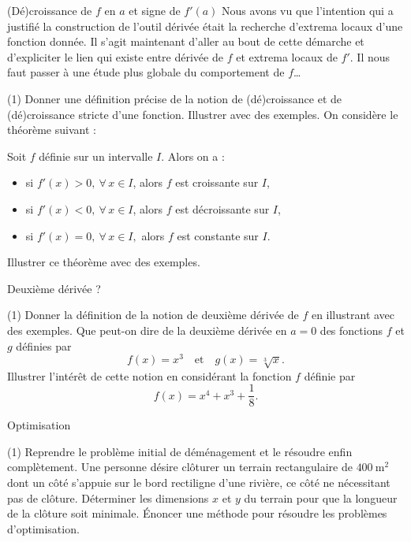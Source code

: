 \documentclass[a4paper,12pt]{article}
\begin{document}
\begin{activite}{(Dé)croissance de \(f\) en \(a\) et signe de \(f'(a)\)}
\tcblower
Nous avons vu que l’intention qui a justifié la construction de l’outil dérivée était la recherche d’extrema locaux d’une fonction donnée. Il s’agit maintenant d’aller au bout de cette démarche et d’expliciter le lien qui existe entre dérivée de \(f\) et extrema locaux de \(f'\). Il nous faut passer à une étude plus globale du comportement de \(f\)\ldots

\begin{tasks}(1)
  \task Donner une définition précise de la notion de (dé)croissance et de (dé)croissance stricte d’une fonction. Illustrer avec des exemples.
  \task On considère le théorème suivant :

  Soit \(f\) définie sur un intervalle \(I\). Alors on a :
  \begin{itemize}
	  \item si $f'(x)>0,\ \forall\,x\in I$, alors $f$ est croissante sur $I$,
\item si $f'(x)<0,\ \forall\,x\in I$, alors $f$ est décroissante sur $I$,
\item si $f'(x)=0,\ \forall\,x\in I,$ alors $f$ est constante sur $I$.
\end{itemize}
  Illustrer ce théorème avec des exemples.
\end{tasks}
\end{activite}

\begin{activite}{Deuxième dérivée ?}
\tcblower
\begin{tasks}(1)
  \task Donner la définition de la notion de deuxième dérivée de \(f\) en illustrant avec des exemples.
  \task Que peut-on dire de la deuxième dérivée en \(a=0\) des fonctions \(f\) et \(g\) définies par
  \[
    f(x)=x^3
    \quad\text{et}\quad
    g(x)=\sqrt[3]{x}.
  \]
  \task Illustrer l’intérêt de cette notion en considérant la fonction \(f\) définie par
  \[
    f(x)=x^4+x^3+\dfrac{1}{8}.
  \]
\end{tasks}
\end{activite}

\begin{activite}{Optimisation}
\tcblower
\begin{tasks}(1)
  \task Reprendre le problème initial de déménagement et le résoudre enfin complètement.
  \task Une personne désire clôturer un terrain rectangulaire de $400~\text{m}^2$ dont un côté s’appuie sur le bord rectiligne d’une rivière, ce côté ne nécessitant pas de clôture. Déterminer les dimensions \(x\) et \(y\) du terrain pour que la longueur de la clôture soit minimale.
  \task Énoncer une méthode pour résoudre les problèmes d’optimisation.
\end{tasks}
\end{activite}
\end{document}
